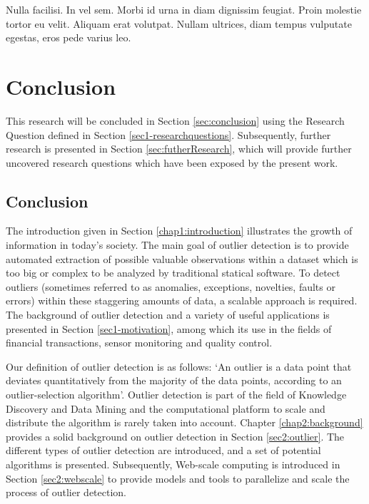\begin{savequote}[75mm] 
Nulla facilisi. In vel sem. Morbi id urna in diam dignissim feugiat. Proin molestie tortor eu velit. Aliquam erat volutpat. Nullam ultrices, diam tempus vulputate egestas, eros pede varius leo.
\end{savequote}


\chapter{Conclusion \label{chap6:results}}

This research will be concluded in Section \ref{sec:conclusion} using the Research Question defined in Section \ref{sec1-researchquestions}. Subsequently, further research is presented in Section \ref{sec:futherResearch}, which will provide further uncovered research questions which have been exposed by the present work.

\section{Conclusion \label{sec:conclusion}}

The introduction given in Section \ref{chap1:introduction} illustrates the growth of information in today's society. The main goal of outlier detection is to provide automated extraction of possible valuable observations within a dataset which is too big or complex to be analyzed by traditional statical software. To detect outliers (sometimes referred to as anomalies, exceptions, novelties, faults or errors) within these staggering amounts of data, a scalable approach is required. The background of outlier detection and a variety of useful applications is presented in Section \ref{sec1-motivation}, among which its use in the fields of financial transactions, sensor monitoring and quality control.

Our definition of outlier detection is as follows: `An outlier is a data point that deviates quantitatively from the majority of the data points, according to an outlier-selection algorithm'. Outlier detection is part of the field of Knowledge Discovery and Data Mining and the computational platform to scale and distribute the algorithm is rarely taken into account. Chapter \ref{chap2:background} provides a solid background on outlier detection in Section \ref{sec2:outlier}. The different types of outlier detection are introduced, and a set of potential algorithms is presented. Subsequently, Web-scale computing is introduced in Section \ref{sec2:webscale} to provide models and tools to parallelize and scale the process of outlier detection.

